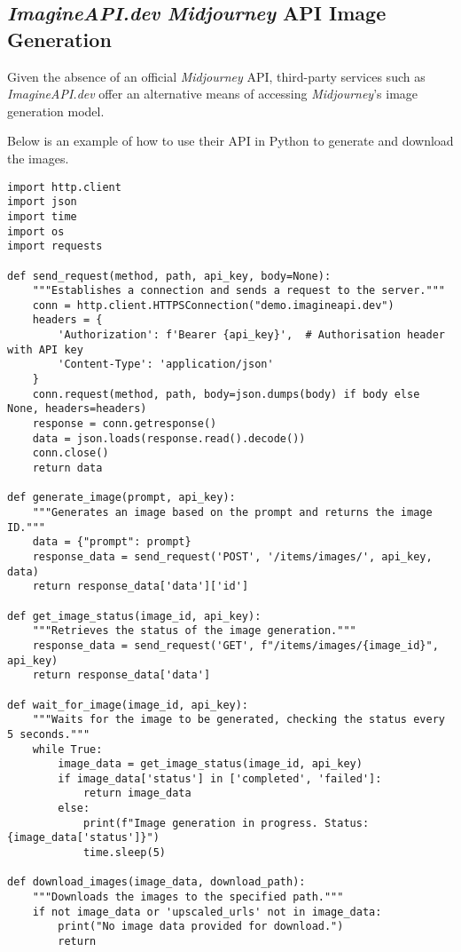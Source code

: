 \subsection{\textit{ImagineAPI.dev} \textit{Midjourney} API Image Generation}
\label{subsec:midjourney-api}

Given the absence of an official \textit{Midjourney} API, third-party services such as \textit{ImagineAPI.dev} offer an alternative means of accessing \textit{Midjourney}'s image generation model. 

Below is an example of how to use their API in Python to generate and download the images.

\begin{lstlisting}
import http.client
import json
import time
import os
import requests

def send_request(method, path, api_key, body=None):
    """Establishes a connection and sends a request to the server."""
    conn = http.client.HTTPSConnection("demo.imagineapi.dev")
    headers = {
        'Authorization': f'Bearer {api_key}',  # Authorisation header with API key
        'Content-Type': 'application/json'
    }
    conn.request(method, path, body=json.dumps(body) if body else None, headers=headers)
    response = conn.getresponse()
    data = json.loads(response.read().decode())
    conn.close()
    return data

def generate_image(prompt, api_key):
    """Generates an image based on the prompt and returns the image ID."""
    data = {"prompt": prompt}
    response_data = send_request('POST', '/items/images/', api_key, data)
    return response_data['data']['id']

def get_image_status(image_id, api_key):
    """Retrieves the status of the image generation."""
    response_data = send_request('GET', f"/items/images/{image_id}", api_key)
    return response_data['data']

def wait_for_image(image_id, api_key):
    """Waits for the image to be generated, checking the status every 5 seconds."""
    while True:
        image_data = get_image_status(image_id, api_key)
        if image_data['status'] in ['completed', 'failed']:
            return image_data
        else:
            print(f"Image generation in progress. Status: {image_data['status']}")
            time.sleep(5)

def download_images(image_data, download_path):
    """Downloads the images to the specified path."""
    if not image_data or 'upscaled_urls' not in image_data:
        print("No image data provided for download.")
        return


\end{lstlisting}
